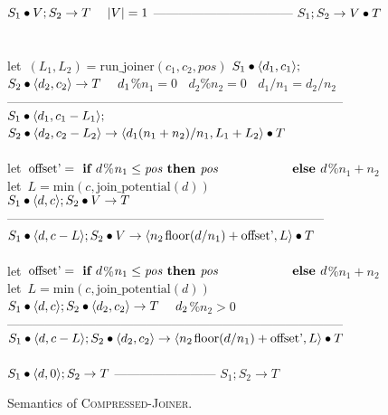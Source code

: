 \begin{figure}[t]
$S_1 \bullet V; S_2 \rightarrow T~~~~|V|=1$\skiptopb
---------------------------------\skipbot
$S_1; S_2 \rightarrow V \bullet T$
~ \\ ~ \\
let~$(L_1, L_2) = \mbox{run\_joiner}(c_1, c_2, pos)$\skiptopb
$S_1 \bullet \langle d_1, c_1\rangle;$\\
$S_2 \bullet \langle d_2, c_2\rangle \rightarrow T~~~~d_1$\%$n_1=0~~~~d_2$\%$n_2=0~~~~d_1/n_1=d_2/n_2$\vspace{-3pt}\skiptopa
--------------------------------------------------------------------------------\skipbot
$S_1 \bullet \langle d_1, c_1-L_1\rangle;$\\
$S_2 \bullet \langle d_2, c_2-L_2\rangle \rightarrow \langle d_1(n_1+n_2)/n_1, L_1+L_2\rangle \bullet T$
~ \\ ~ \\
let~$\mbox{offset'} = \mbox{\bf ~if~} d$\%$n_1 \leq \mbox{\it pos} \mbox{\bf ~then~} \mbox{\it pos}$\skiptopb
$\mbox{~~~~}\hspace{37.7pt}\mbox{\bf ~else~} d$\%$n_1 + n_2$\\
let~$L=\mbox{min}(c,\mbox{join\_potential}(d))$\\
$S_1 \bullet \langle d, c\rangle; S_2 \bullet V \rightarrow T$\vspace{-3pt}\skiptopa
---------------------------------------------------------------------------\skipbot
$S_1 \bullet \langle d, c-L\rangle; S_2 \bullet V \rightarrow \langle n_2{\hspace{1.3pt}}\mbox{floor}(d/n_1) + \mbox{offset'}, L\rangle \bullet T$
~ \\ ~ \\
let~$\mbox{offset'} = \mbox{\bf ~if~} d$\%$n_1 \leq \mbox{\it pos} \mbox{\bf ~then~} \mbox{\it pos}$\skiptopb
$\mbox{~~~~}\hspace{37.7pt}\mbox{\bf ~else~} d$\%$n_1 + n_2$\\
let~$L=\mbox{min}(c,\mbox{join\_potential}(d))$\\
$S_1 \bullet \langle d, c\rangle; S_2 \bullet \langle d_2, c_2\rangle \rightarrow T~~~~d_2$\%$n_2 > 0$\vspace{-3pt}\skiptopa
--------------------------------------------------------------------------------\skipbot
$S_1 \bullet \langle d, c-L\rangle; S_2 \bullet \langle d_2, c_2\rangle \rightarrow \langle n_2{\hspace{1.3pt}}\mbox{floor}(d/n_1) + \mbox{offset'}, L\rangle \bullet T$
\\ ~ \\
$S_1 \bullet \langle d, 0\rangle; S_2 \rightarrow T$\skiptopb
------------------------\skipbot
$S_1; S_2 \rightarrow T$
\caption{Semantics of \textsc{Compressed-Joiner}.
\protect\label{fig:compressed-joiner}}
\end{figure}

